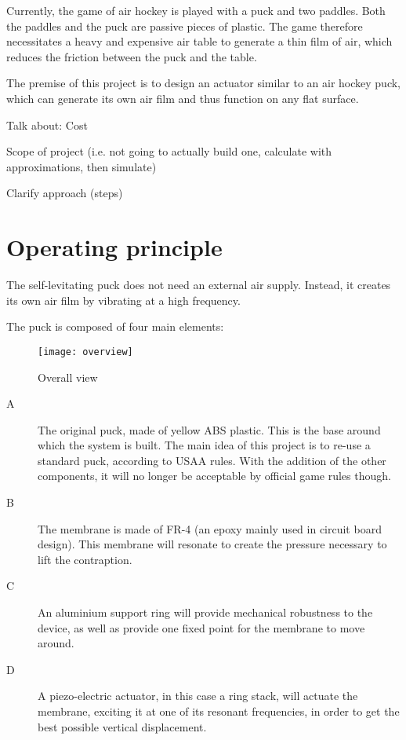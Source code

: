 Currently, the game of air hockey is played with a puck and two 
paddles.
Both the paddles and the puck are passive pieces of plastic. The game therefore
necessitates a heavy and expensive air table to generate a thin film of air,
which reduces the friction between the puck and the table.

The premise of this project is to design an actuator similar to an air hockey
puck, which can generate its own air film and thus function on any flat surface.

Talk about:
Cost

Scope of project (i.e. not going to actually build one, calculate with
approximations, then simulate)

Clarify approach (steps)

\asterbreak


\section{Operating principle}

The self-levitating puck does not need an external air supply. Instead, it
creates its own air film by vibrating at a high frequency.

The puck is composed of four main elements:

\begin{figure}[h]
  \begin{center}
    \texttt{[image: overview]}
  \end{center}
  \caption{Overall view}
  \label{fig:overview}
\end{figure}

\begin{description}
  \item[A] The original puck, made of yellow ABS plastic. This is the base
    around which the system is built. The main idea of this project is to re-use
    a standard puck, according to USAA rules. With the addition of the other
    components, it will no longer be acceptable by official game rules though.
  \item[B] The membrane is made of FR-4 (an epoxy mainly used in circuit board
    design). This membrane will resonate to create the pressure necessary to
    lift the contraption.
  \item[C] An aluminium support ring will provide mechanical robustness to the
    device, as well as provide one fixed point for the membrane to move around.
  \item[D] A piezo-electric actuator, in this case a ring stack, will actuate
    the membrane, exciting it at one of its resonant frequencies, in order to
    get the best possible vertical displacement.
\end{description}

